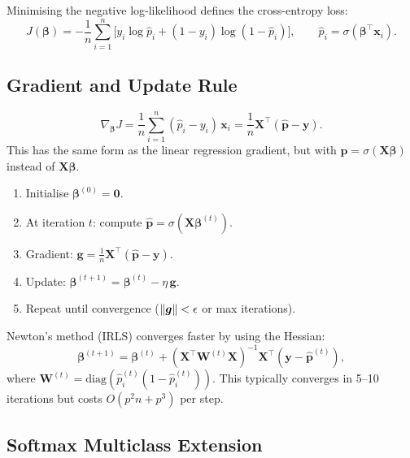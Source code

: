 \begin{definition}
Minimising the negative log-likelihood defines the cross-entropy loss:
\[
    J(\bm{\beta}) = -\frac{1}{n}\sum_{i=1}^{n}\bigl[y_i\log\hat{p}_i + (1-y_i)\log(1-\hat{p}_i)\bigr],
    \qquad \hat{p}_i = \sigma(\bm{\beta}^\top\bm{x}_i).
\]
\end{definition}

\subsection{Gradient and Update Rule}

\begin{proposition}
\[
    \nabla_{\bm{\beta}} J = \frac{1}{n}\sum_{i=1}^{n}(\hat{p}_i - y_i)\,\bm{x}_i
    = \frac{1}{n}\bm{X}^\top(\hat{\bm{p}} - \bm{y}).
\]
This has the same form as the linear regression gradient, but with $\hat{\bm{p}} = \sigma(\bm{X}\bm{\beta})$ instead of $\bm{X}\bm{\beta}$.
\end{proposition}

\begin{algorithme}[title=\textbf{Gradient Descent for Logistic Regression}]
\begin{enumerate}
    \item Initialise $\bm{\beta}^{(0)} = \bm{0}$.
    \item At iteration $t$: compute $\hat{\bm{p}} = \sigma(\bm{X}\bm{\beta}^{(t)})$.
    \item Gradient: $\bm{g} = \frac{1}{n}\bm{X}^\top(\hat{\bm{p}} - \bm{y})$.
    \item Update: $\bm{\beta}^{(t+1)} = \bm{\beta}^{(t)} - \eta\,\bm{g}$.
    \item Repeat until convergence ($\left\| \bm{g} \right\| < \epsilon$ or max iterations).
\end{enumerate}
\end{algorithme}

\begin{remark}
Newton's method (IRLS) converges faster by using the Hessian:
\[
    \bm{\beta}^{(t+1)} = \bm{\beta}^{(t)} + (\bm{X}^\top\bm{W}^{(t)}\bm{X})^{-1}\bm{X}^\top(\bm{y}-\hat{\bm{p}}^{(t)}),
\]
where $\bm{W}^{(t)} = \text{diag}(\hat{p}_i^{(t)}(1-\hat{p}_i^{(t)}))$. This typically converges in 5--10 iterations but costs $O(p^2 n + p^3)$ per step.
\end{remark}

\subsection{Softmax Multiclass Extension}

